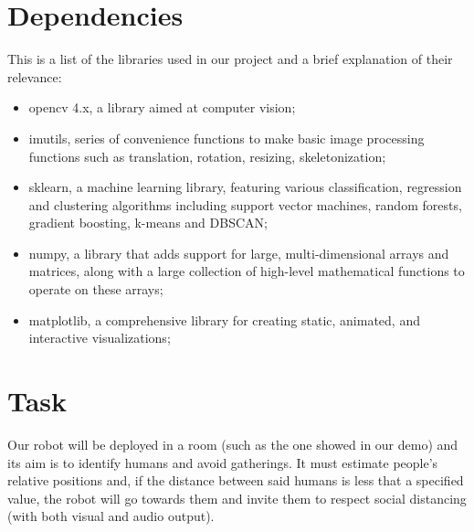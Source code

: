 \documentclass[a4paper]{article}
\begin{document}
	\section{Dependencies}
	This is a list of the libraries used in our project and a brief explanation of their relevance:
	\begin{itemize}
		\item opencv 4.x, a library aimed at computer vision\cite{opencv};
		\item imutils, series of convenience functions to make basic image processing functions such as translation, rotation, resizing, skeletonization\cite{imutils};
		\item sklearn, a machine learning library, featuring various classification, regression and clustering algorithms including support vector machines, random forests, gradient boosting, k-means and DBSCAN\cite{scikit};
		\item numpy, a library that adds support for large, multi-dimensional arrays and matrices, along with a large collection of high-level mathematical functions to operate on these arrays\cite{numpy};
		\item matplotlib, a comprehensive library for creating static, animated, and interactive visualizations\cite{matplotlib};
	\end{itemize}

	\section{Task}
	Our robot will be deployed in a room (such as the one showed in our demo) and its aim is to identify humans and avoid gatherings. It must estimate people's relative positions and, if the distance between said humans is less that a specified value, the robot will go towards them and invite them to respect social distancing (with both visual and audio output).
	
\end{document}
